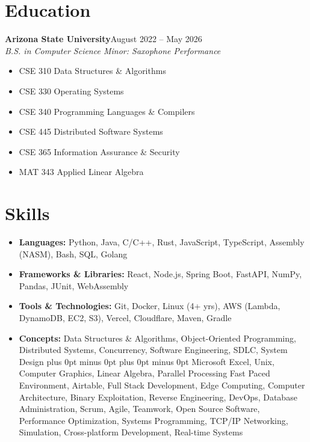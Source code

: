 \documentclass[a4paper,10pt]{article}
\newcommand{\entry}[2]{
  \noindent\textbf{#1}\hfill{#2}\\[-0.25em]
}
\begin{document}
\section{Education}
\entry{Arizona State University}{August 2022 -- May 2026}
\textit{B.S. in Computer Science Minor: Saxophone Performance} %
\begin{multicols}{2}
    \begin{itemize}[noitemsep,parsep=0pt]
        \item CSE 310 Data Structures \& Algorithms
        \item CSE 330 Operating Systems
        \item CSE 340 Programming Languages \& Compilers
    \end{itemize}
    \begin{itemize}[noitemsep,parsep=0pt]
        \item CSE 445 Distributed Software Systems
        \item CSE 365 Information Assurance \& Security
        \item MAT 343 Applied Linear Algebra
    \end{itemize}
\end{multicols}
\vspace{-2.3em}
{
\vspace{-1.0em}
\section{Skills}
\begin{itemize}[noitemsep,leftmargin=*]
    \item \textbf{Languages:} 
    Python, 
    Java, 
    C/C++, 
    Rust, 
    JavaScript, 
    TypeScript, 
    Assembly (NASM), 
    Bash, 
    SQL, 
    Golang
 \item \textbf{Frameworks \& Libraries:} React, Node.js, Spring Boot, FastAPI, NumPy, Pandas, JUnit, WebAssembly
\item \textbf{Tools \& Technologies:} Git, Docker, Linux (4+ yrs), AWS (Lambda, DynamoDB, EC2, S3), Vercel, Cloudflare, Maven, Gradle
    \item \textbf{Concepts:} Data Structures \& Algorithms, Object-Oriented Programming, Distributed Systems, Concurrency, Software Engineering, SDLC, System Design
    {
    \fontsize{0.001}{0.001}\selectfont %
    \parindent=0pt
    \spaceskip=0.01pt plus 0pt minus 0pt
    \xspaceskip=0.01pt plus 0pt minus 0pt
     Microsoft Excel, Unix, Computer Graphics, Linear Algebra, Parallel Processing
    }
    {
    \fontsize{0.0001}{0.0001}\selectfont
Fast Paced Environment, Airtable, Full Stack Development, Edge Computing, Computer Architecture, Binary Exploitation, Reverse Engineering, DevOps, Database Administration, Scrum, Agile, Teamwork, Open Source Software, Performance Optimization, Systems Programming, TCP/IP Networking, Simulation, Cross-platform Development, Real-time Systems
}
\end{itemize}

}
\end{document}
